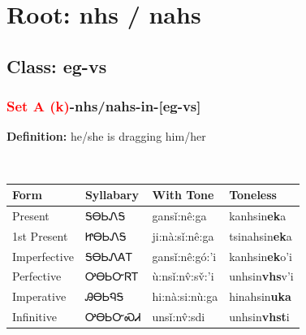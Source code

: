 \needspace{4in}
\section*{Root: nhs / nahs}
\nopagebreak
{}
\needspace{3in}
\subsection*{Class: eg-vs}
\nopagebreak
\needspace{2in}
\subsubsection*{\textcolor{Red}{Set A (k)}{-}\textbf{nhs/nahs}{-}in{-}[eg-vs]}
\nopagebreak
\textbf{Definition: } he/she is dragging him/her
\\[0.5em]
\begin{tabularx}{\textwidth}{l X X X}%
\toprule%
\textbf{Form}&\textbf{Syllabary}&\textbf{With Tone}&\textbf{Toneless}\\%
\midrule%
Present&ᎦᎾᏏᏁᎦ&gansǐ:nê:ga&kanhsin\textbf{ek}a\\%
1st Present&ᏥᎾᏏᏁᎦ&ji:nà:sǐ:nê:ga&tsinahsin\textbf{ek}a\\%
Imperfective&ᎦᎾᏏᏁᎪᎢ&gansǐ:nê:gó:’i&kanhsin\textbf{ek}o'i\\%
Perfective&ᎤᎾᏏᏅᏒᎢ&ù:nsǐ:nv̂:sv̌:’i&unhsin\textbf{vhs}v'i\\%
Imperative&ᎯᎾᏏᏄᎦ&hi:nà:si:nù:ga&hinahsin\textbf{uka}\\%
Infinitive&ᎤᎾᏏᏅᏍᏗ&unsǐ:nv̂:sdi&unhsin\textbf{vhst}i\\%
\bottomrule%
\end{tabularx}
\\[1em]